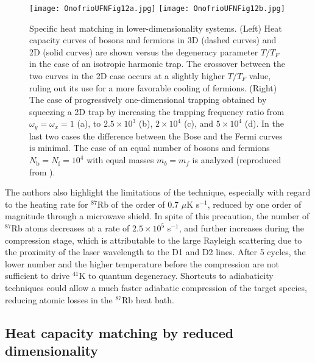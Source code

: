 \documentclass[pra,letterpaper,twocolumn,showpacs,superscriptaddress]{revtex4}
\begin{document}
\begin{figure*}[t]
\begin{center}
\texttt{[image: OnofrioUFNFig12a.jpg]}
\texttt{[image: OnofrioUFNFig12b.jpg]}
\end{center}
\caption{Specific heat matching in lower-dimensionality systems. (Left) Heat capacity curves of bosons and fermions in 3D (dashed
curves) and 2D (solid curves) are shown versus the degeneracy parameter $T/T_F$ in the case of an isotropic harmonic trap. 
The crossover between the two curves in the 2D case occurs at a slightly higher $T/T_F$ value, ruling out its use for a more 
favorable cooling of fermions. (Right) The case of progressively one-dimensional trapping obtained by squeezing a 2D trap 
by increasing the trapping frequency ratio from $\omega_y=\omega_x=1$ (a), to $2.5 \times 10^3$ (b), $2 \times 10^4$ (c), and 
$5 \times 10^4$ (d). In the last two cases the difference between the Bose and the Fermi curves is minimal. The case of an equal number 
of bosons and fermions $N_\mathrm{b}=N_\mathrm{f}=10^4$  with equal masses $m_b=m_f$ is analyzed (reproduced from \cite{Brown2008}).}
\end{figure*}

The authors also highlight the limitations of the technique, especially with regard to 
the heating rate for ${}^{87}$Rb of the order of 0.7 $\mu$K s${}^{-1}$, reduced by one order of magnitude through 
a microwave shield. In spite of this precaution, the number of ${}^{87}$Rb atoms decreases at a rate of 
$2.5 \times 10^5$ s${}^{-1}$, and further increases during the compression stage, which is attributable to the large Rayleigh 
scattering due to the proximity of the laser wavelength to the D1 and D2 lines. 
After 5 cycles, the lower number and the higher temperature before the compression are not 
sufficient to drive ${}^{41}$K to quantum degeneracy. Shortcuts to adiabaticity techniques could allow 
a much faster adiabatic compression of the target species, reducing atomic losses in the ${}^{87}$Rb heat bath.

\subsection{Heat capacity matching by reduced dimensionality}
\end{document}
